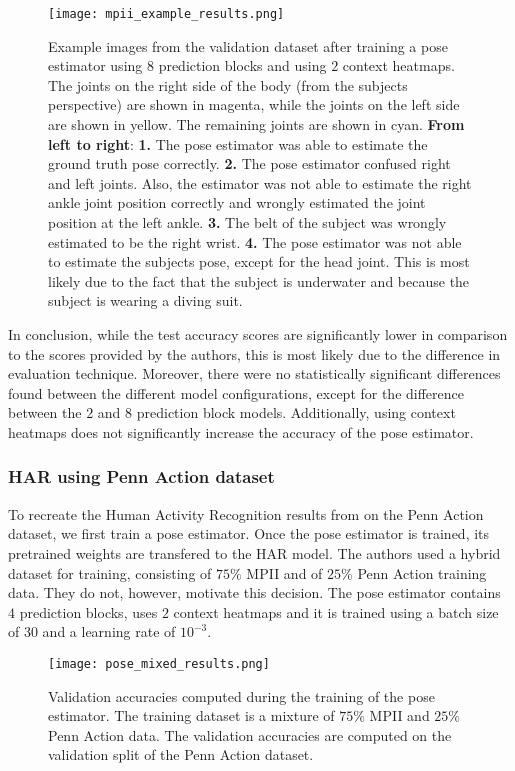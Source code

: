 \begin{figure}[htb!]
    \centering
    \texttt{[image: mpii\_example\_results.png]}
    \caption{Example images from the validation dataset after training a pose estimator using $8$ prediction blocks and using $2$ context heatmaps. The joints on the right side of the body (from the subjects perspective) are shown in magenta, while the joints on the left side are shown in yellow. The remaining joints are shown in cyan. \textbf{From left to right}: \textbf{1.} The pose estimator was able to estimate the ground truth pose correctly. \textbf{2.} The pose estimator confused right and left joints. Also, the estimator was not able to estimate the right ankle joint position correctly and wrongly estimated the joint position at the left ankle. \textbf{3.} The belt of the subject was wrongly estimated to be the right wrist. \textbf{4.} The pose estimator was not able to estimate the subjects pose, except for the head joint. This is most likely due to the fact that the subject is underwater and because the subject is wearing a diving suit.}
    \label{fig:mpii_example_results}
\end{figure}
In conclusion, while the test accuracy scores are significantly lower in comparison to the scores provided by the authors, this is most likely due to the difference in evaluation technique.
Moreover, there were no statistically significant differences found between the different model configurations, except for the difference between the $2$ and $8$ prediction block models.
Additionally, using context heatmaps does not significantly increase the accuracy of the pose estimator.

\subsubsection{HAR using Penn Action dataset}
\label{sec:exp-har-pennaction}
To recreate the Human Activity Recognition results from \cite{luvizon_2d/3d_2018} on the Penn Action dataset, we first train a pose estimator.
Once the pose estimator is trained, its pretrained weights are transfered to the HAR model.
The authors used a hybrid dataset for training, consisting of $75\%$ MPII and of $25\%$ Penn Action training data.
They do not, however, motivate this decision.
The pose estimator contains $4$ prediction blocks, uses $2$ context heatmaps and it is trained using a batch size of $30$ and a learning rate of $10^{-3}$.

\begin{figure}[htb!]
    \centering
    \texttt{[image: pose\_mixed\_results.png]}
    \caption{Validation accuracies computed during the training of the pose estimator. The training dataset is a mixture of $75\%$ MPII and $25\%$ Penn Action data. The validation accuracies are computed on the validation split of the Penn Action dataset. }
    \label{fig:pose_mixed_results}
\end{figure}

